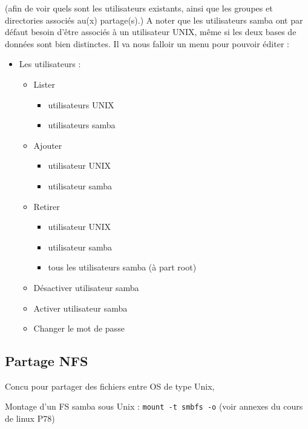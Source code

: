 \documentclass{article}
\begin{document}
	(afin de voir quels sont les utilisateurs existants, ainsi que les groupes et directories associés au(x) partage(s).)
	A noter que les utilisateurs samba ont par défaut besoin d'être associés à un utilisateur UNIX, même si les deux bases de données sont bien distinctes.
	Il va nous falloir un menu pour pouvoir éditer :
	\begin{itemize}
		\item Les utilisateurs :
		\begin{itemize}
			\item[\checkmark] Lister  
			\begin{itemize}
				\item[\checkmark] utilisateurs UNIX
				\item[\checkmark] utilisateurs samba
			\end{itemize}
			\item[\checkmark] Ajouter 
			\begin{itemize}
					\item[\checkmark] utilisateur UNIX
				\item[\checkmark] utilisateur samba 
			\end{itemize}
			\item Retirer
						\begin{itemize}
				\item utilisateur UNIX
				\item[\checkmark] utilisateur samba 
				\item [\checkmark] tous les utilisateurs samba (à part root)
			\end{itemize}
			\item Désactiver utilisateur samba
			\item Activer utilisateur samba
			\item Changer le mot de passe
		\end{itemize}	
	\end{itemize}
	\subsection{Partage NFS}
	Concu pour partager des fichiers entre OS de type Unix, 
	
	Montage d'un FS samba sous Unix :
	\texttt{mount -t smbfs -o} (voir annexes du cours de linux P78)
	
	\newpage
	
	
	
	
	
	
	
	
	
\end{document}
